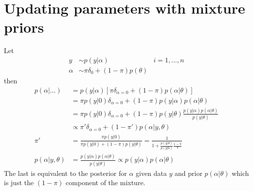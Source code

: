 \documentclass{article}
\begin{document}
\section{Updating parameters with mixture priors}

Let 
\begin{align*}
y &\sim p(y|\alpha) & i=1,\ldots,n \\
\alpha&\sim \pi \delta_0 +(1-\pi) p(\theta)
\end{align*}
then
\begin{align*}
p(\alpha|\ldots) &= p(y|\alpha)[\pi \delta_{\alpha=0} +(1-\pi) p(\alpha|\theta) ] \\
&= \pi p(y|0) \delta_{\alpha=0} + (1-\pi) p(y|\alpha) p(\alpha|\theta) \\
&= \pi p(y|0) \delta_{\alpha=0} + (1-\pi) p(y|\theta) \frac{p(y|\alpha) p(\alpha|\theta)}{p(y|\theta)} \\
&\propto \pi' \delta_{\alpha=0} + (1-\pi') p(\alpha|y,\theta) \\
\pi' &= \frac{\pi p(y|0)}{\pi p(y|0) + (1-\pi) p(y|\theta)} = \frac{1}{1+\frac{p(y|\theta)}{p(y|0)}\frac{1-\pi}{\pi}} \\
p(\alpha|y,\theta) &= \frac{p(y|\alpha) p(\alpha|\theta)}{p(y|\theta)} \propto p(y|\alpha) p(\alpha|\theta)
\end{align*}
The last is equivalent to the posterior for $\alpha$ given data $y$ and prior $p(\alpha|\theta)$ which is just the $(1-\pi)$ component of the mixture. 
\end{document}
